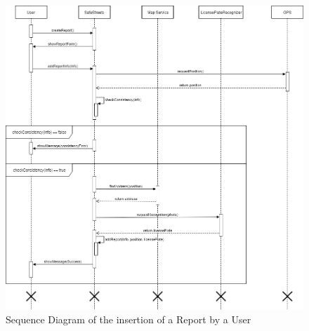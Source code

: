     \begin{figure}[h]
        \centering
        \includegraphics[scale=0.5]{Images/SeqDiag_addReport.png}
        \caption{Sequence Diagram of the insertion of a Report by a User}
    \end{figure}
    
